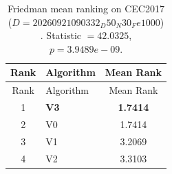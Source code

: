 \begin{center}
\small
\renewcommand{\arraystretch}{1.25}
\begin{longtable}{clc}
\caption{Friedman mean ranking on CEC2017 ($D=20260921090332_D50_N30_Fe1000$) . Statistic $=42.0325$, $p=3.9489e-09$.}
\label{tab:friedman_CEC2017_20260921090332_D50_N30_Fe1000} \\
\toprule
Rank & Algorithm & Mean Rank \\
\midrule
\endfirsthead
\toprule
Rank & Algorithm & Mean Rank \\
\midrule
\endhead
1 & \textbf{V3} & \textbf{1.7414} \\
2 & V0 & 1.7414 \\
3 & V1 & 3.2069 \\
4 & V2 & 3.3103 \\
\bottomrule
\end{longtable}
\end{center}